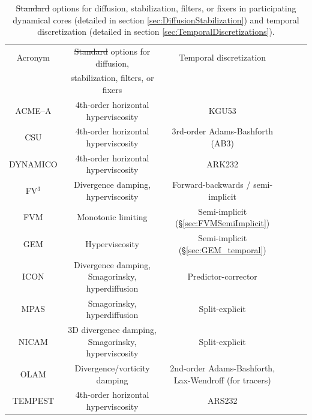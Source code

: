 \documentclass[gmd, manuscript]{copernicus}
\providecommand{\DIFadd}[1]{{\protect\color{blue}\uwave{#1}}} %
\providecommand{\DIFdel}[1]{{\protect\color{red}\sout{#1}}}                      %
\providecommand{\DIFaddFL}[1]{\DIFadd{#1}} %
\providecommand{\DIFdelFL}[1]{\DIFdel{#1}} %
\providecommand{\DIFaddbeginFL}{} %
\providecommand{\DIFaddendFL}{} %
\providecommand{\DIFdelbeginFL}{} %
\providecommand{\DIFdelendFL}{} %
\begin{document}
\begin{table}[p]
\caption{\DIFdelbeginFL \DIFdelFL{Standard }\DIFdelendFL \DIFaddbeginFL \DIFaddFL{Principal }\DIFaddendFL options for diffusion, stabilization, filters, or fixers in participating dynamical cores (detailed in section \ref{sec:DiffusionStabilization}) and temporal discretization (detailed in section \ref{sec:TemporalDiscretizations}).} \label{tab:ModelsTemporalDiffusion}
\begin{center}
\begin{tabular}{cccccc}
\hline Acronym & \DIFdelbeginFL \DIFdelFL{Standard }\DIFdelendFL \DIFaddbeginFL \DIFaddFL{Principal }\DIFaddendFL options for diffusion, & Temporal discretization \\
& stabilization, filters, or fixers & \\ \hline 
ACME--A & 4th-order horizontal hyperviscosity & KGU53 \citep{guerra2016high} \\
CSU & 4th-order horizontal hyperviscosity & 3rd-order Adams-Bashforth (AB3) \\
DYNAMICO & 4th-order horizontal hyperviscosity & ARK232 \citep{giraldo2013implicit} \\
FV$^3$ & Divergence damping, hyperviscosity & Forward-backwards \citep{LR1997QJR} / semi-implicit \\
FVM & Monotonic limiting & Semi-implicit \citep{smolarkiewiczJCP2014} (\S \ref{sec:FVMSemiImplicit}) \\
GEM & Hyperviscosity & Semi-implicit \citep{Girard2014} (\S \ref{sec:GEM_temporal}) \\
ICON & Divergence damping, Smagorinsky, hyperdiffusion & Predictor-corrector \\
MPAS & Smagorinsky, hyperdiffusion & Split-explicit \citep{klemp2007conservative} \\
NICAM & 3D divergence damping, Smagorinsky, hyperviscosity & Split-explicit \citep{klemp2007conservative} \\
OLAM & Divergence/vorticity damping & 2nd-order Adams-Bashforth, Lax-Wendroff (for tracers) \\
TEMPEST & 4th-order horizontal hyperviscosity & ARS232 \citep{ascher1997implicit} \\
\hline 
\end{tabular}
\end{center}
\end{table}

\end{document}
